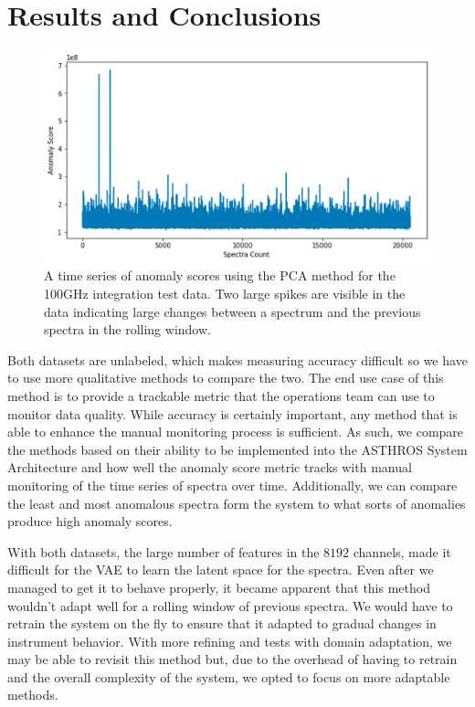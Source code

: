\section{Results and Conclusions}
\label{spectra/sec:results}
\begin{figure}[b]
    \centering
    \includegraphics[width=0.5\linewidth]{figs/spectra/asthros_timeseries.png}
    \caption[Anomaly Score Over Time During the 100GHz Integration Test]{A time series of anomaly scores using the PCA method for the 100GHz integration test data. Two large spikes are visible in the data indicating large changes between a spectrum and the previous spectra in the rolling window.}
    \label{spectra/fig:timeseries}
\end{figure}

Both datasets are unlabeled, which makes measuring accuracy difficult so we have to use more qualitative methods to compare the two.
The end use case of this method is to provide a trackable metric that the operations team can use to monitor data quality.
While accuracy is certainly important, any method that is able to enhance the manual monitoring process is sufficient. 
As such, we compare the methods based on their ability to be implemented into the ASTHROS System Architecture and how well the anomaly score metric tracks with manual monitoring of the time series of spectra over time. 
Additionally, we can compare the least and most anomalous spectra form the system to what sorts of anomalies produce high anomaly scores. 

With both datasets, the large number of features in the $8192$ channels, made it difficult for the VAE to learn the latent space for the spectra. 
Even after we managed to get it to behave properly, it became apparent that this method wouldn't adapt well for a rolling window of previous spectra. 
We would have to retrain the system on the fly to ensure that it adapted to gradual changes in instrument behavior.
With more refining and tests with domain adaptation, we may be able to revisit this method but, due to the overhead of having to retrain and the overall complexity of the system, we opted to focus on more adaptable methods. 


